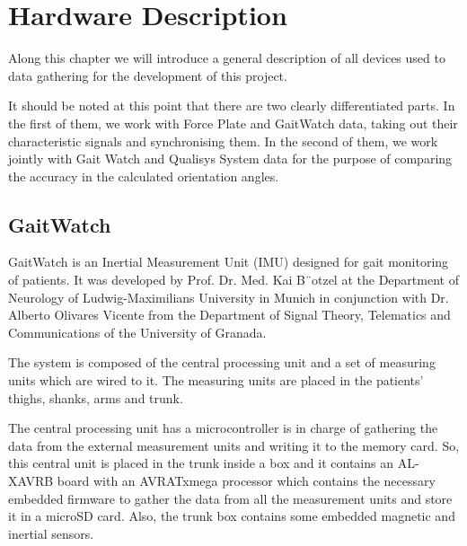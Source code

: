 \chapter{Hardware Description}
\label{ch:Hardware}
Along this chapter we will introduce a general description of all devices used to data gathering for the development of this project.


It should be noted at this point that there are two clearly differentiated parts. In the first of them, we work with Force Plate and GaitWatch data, taking out their characteristic signals and synchronising them. In the second of them, we work jointly with Gait Watch and Qualisys System data for the purpose of comparing the accuracy in the calculated orientation angles.


\section{GaitWatch}

GaitWatch is an Inertial Measurement Unit (IMU) designed for gait monitoring of patients. It was developed by Prof. Dr. Med. Kai B¨otzel at the Department of Neurology of Ludwig-Maximilians University in Munich in conjunction with Dr. Alberto Olivares Vicente from the Department of Signal Theory, Telematics and Communications of the University of Granada. \cite{OlivaresBotzel2013}

The system is composed of the central processing unit and
a set of measuring units which are wired to it. The measuring units are 
placed in the patients’ thighs, shanks, arms and trunk.

The central processing unit has a microcontroller is in charge of gathering the data from the external measurement units and writing it to the memory card. So, this central unit is placed in the trunk inside a box and it contains an AL-XAVRB board with an AVRATxmega processor which contains the necessary embedded firmware to gather the data from all the measurement units and store it in a microSD card. Also, the trunk box contains some embedded magnetic and inertial sensors.

